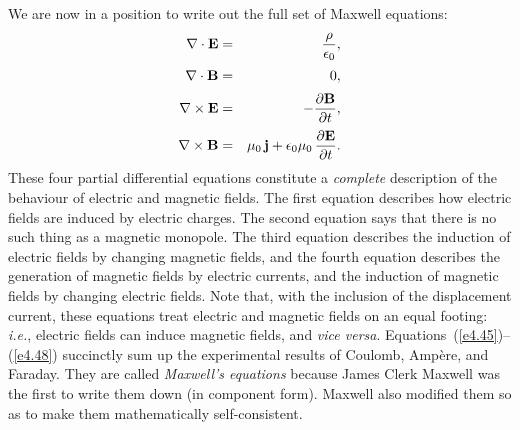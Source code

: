 We are now in a position to write out the full set of Maxwell equations:
\begin{eqnarray}\label{e4.45}
\nabla\cdot{\bf E} &=& \frac{\rho}{\epsilon_0}, \\[0.5ex]
\nabla\cdot{\bf B} &=& 0, \label{e4.46}\\[0.5ex]
\nabla\times{\bf E} &=& - \frac{\partial {\bf B}}{\partial t},\label{e4.47} \\[0.5ex]
\nabla\times{\bf B} &=& \mu_0\, {\bf j}+ \epsilon_0\mu_0\,
\frac{\partial {\bf E}}{\partial
t}.\label{e4.48}
\end{eqnarray}
These four partial differential equations constitute a {\em complete}\/ description 
of the behaviour of electric and magnetic fields. The first equation describes
how electric fields are induced by electric charges. The second equation says that there
is no such thing as a magnetic monopole. The third equation describes the induction
of electric fields by changing magnetic fields, and the fourth equation describes
the generation of magnetic fields by electric currents, and the induction of
magnetic fields by changing electric fields. Note that, with the inclusion of the
displacement current, these equations treat electric and magnetic fields on
an equal footing: {\em i.e.}, electric fields can induce magnetic fields, and 
{\em vice versa}. Equations~(\ref{e4.45})--(\ref{e4.48}) succinctly sum up the experimental results of
Coulomb, Amp\`{e}re, and Faraday.
They are called {\em Maxwell's equations}\/ because
James Clerk Maxwell was the first to write them down (in component form). 
Maxwell also modified them so as to make them mathematically self-consistent.

